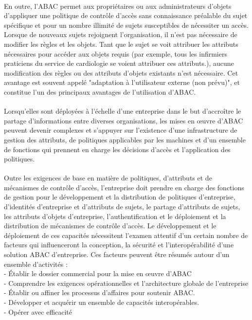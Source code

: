 \paragraph{} En outre, l'ABAC permet aux propriétaires ou aux administrateurs d'objets d'appliquer une politique de contrôle d'accès sans connaissance préalable du sujet spécifique et pour un nombre illimité de sujets susceptibles de nécessiter un accès. Lorsque de nouveaux sujets rejoignent l'organisation, il n'est pas nécessaire de modifier les règles et les objets. Tant que le sujet se voit attribuer les attributs nécessaires pour accéder aux objets requis (par exemple, tous les infirmiers praticiens du service de cardiologie se voient attribuer ces attributs.), aucune modification des règles ou des attributs d'objets existants n'est nécessaire. Cet avantage est souvent appelé "adaptation à l'utilisateur externe (non prévu)", et constitue l'un des principaux avantages de l'utilisation d'ABAC.

\label{sectionInconvénientsABAC}

\paragraph{} Lorsqu'elles sont déployées à l'échelle d'une entreprise dans le but d'accroître le partage d'informations entre diverses organisations, les mises en œuvre d'ABAC peuvent devenir complexes et s'appuyer sur l'existence d'une infrastructure de gestion des attributs, de politiques applicables par les machines et d'un ensemble de fonctions qui prennent en charge les décisions d'accès et l'application des politiques. 
\paragraph{} Outre les exigences de base en matière de politiques, d'attributs et de mécanismes de contrôle d'accès, l'entreprise doit prendre en charge des fonctions de gestion pour le développement et la distribution de politiques d'entreprise, d'identités d'entreprise et d'attributs de sujets, le partage d'attributs de sujets, les attributs d'objets d'entreprise, l'authentification et le déploiement et la distribution de mécanismes de contrôle d'accès. Le développement et le déploiement de ces capacités nécessitent l'examen attentif d'un certain nombre de facteurs qui influenceront la conception, la sécurité et l'interopérabilité d'une solution ABAC d'entreprise. Ces facteurs peuvent être résumés autour d'un ensemble d'activités : \\
- Établir le dossier commercial pour la mise en œuvre d'ABAC \\
- Comprendre les exigences opérationnelles et l'architecture globale de l'entreprise\\
- Établir ou affiner les processus d'affaires pour soutenir ABAC.\\
- Développer et acquérir un ensemble de capacités interopérables.\\
- Opérer avec efficacité\\


